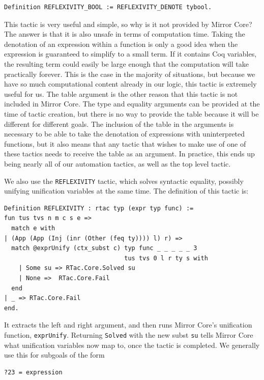 \documentclass{puthesis}
\begin{document}
\begin{lstlisting}
Definition REFLEXIVITY_BOOL := REFLEXIVITY_DENOTE tybool.
\end{lstlisting}

This tactic is very useful and simple, so why is it not provided by
Mirror Core? The answer is that it is also unsafe in terms of
computation time. Taking the
denotation of an expression within a function is only a good idea when
the expression is guaranteed to simplify to a small term. If it
contains Coq variables, the resulting term could easily be large
enough that the computation will take practically forever. This is the
case in the majority of situations, but because we have so much
computational content already in our logic, this tactic is extremely
useful for us. The table argument is the other reason that this tactic
is not included in Mirror Core. The type and equality arguments can be
provided at the time of tactic creation, but there is no way to
provide the table because it will be different for different
goals. The inclusion of the table in the arguments is necessary to be
able to take the denotation of expressions with uninterpreted
functions, but it also means that any tactic that wishes to make use
of one of these tactics needs to receive the table as an argument. In
practice, this ends up being nearly all of our automation tactics, as
well as the top level tactic.

We also use the \lstinline|REFLEXIVITY| tactic, which solves syntactic
equality, possibly unifying unification variables at the same
time. The definition of this tactic is:

\begin{lstlisting}
Definition REFLEXIVITY : rtac typ (expr typ func) :=
fun tus tvs n m c s e => 
  match e with 
| (App (App (Inj (inr (Other (feq ty)))) l) r) =>
  match @exprUnify (ctx_subst c) typ func _ _ _ _ _ 3
                                 tus tvs 0 l r ty s with
    | Some su => RTac.Core.Solved su 
    | None =>  RTac.Core.Fail
  end
| _ => RTac.Core.Fail
end.
\end{lstlisting}

It extracts the left and right argument, and then runs Mirror Core's
unification function, \lstinline|exprUnify|. Returning
\lstinline|Solved| with the new subst \lstinline|su| tells Mirror Core
what unification variables now map to, once the tactic is completed.
We generally use this for subgoals of the form 

\begin{lstlisting}
?23 = expression
\end{lstlisting}
\end{document}
